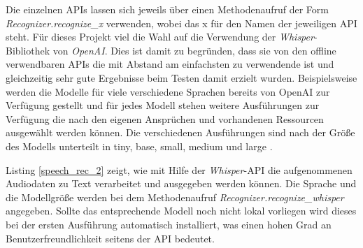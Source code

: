 Die einzelnen \ac{API}s lassen sich jeweils über einen Methodenaufruf der Form \textit{Recognizer.recognize\_x} verwenden, wobei das \glqq{}x\grqq{} für den Namen der jeweiligen \ac{API} steht. Für dieses Projekt viel die Wahl auf die Verwendung der \textit{Whisper}-Bibliothek von \textit{OpenAI}. Dies ist damit zu begründen, dass sie von den offline verwendbaren \ac{API}s die mit Abstand am einfachsten zu verwendende ist und gleichzeitig sehr gute Ergebnisse beim Testen damit erzielt wurden. Beispielsweise werden die Modelle für viele verschiedene Sprachen bereits von OpenAI zur Verfügung gestellt und für jedes Modell stehen weitere Ausführungen zur Verfügung die nach den eigenen Ansprüchen und vorhandenen Ressourcen ausgewählt werden können. Die verschiedenen Ausführungen sind nach der \glqq{}Größe\grqq{} des Modells unterteilt in \glqq{}tiny\grqq{}, \glqq{}base\grqq{}, \glqq{}small\grqq{}, \glqq{}medium\grqq{} und \glqq{}large\grqq{} \cite{whisper_repo}.

Listing \ref{speech_rec_2} zeigt, wie mit Hilfe der \textit{Whisper}-\ac{API} die aufgenommenen Audiodaten zu Text verarbeitet und ausgegeben werden können. Die Sprache und die Modellgröße werden bei dem Methodenaufruf \textit{Recognizer.recognize\_whisper} angegeben. Sollte das entsprechende Modell noch nicht lokal vorliegen wird dieses bei der ersten Ausführung automatisch installiert, was einen hohen Grad an Benutzerfreundlichkeit seitens der \ac{API} bedeutet. 
